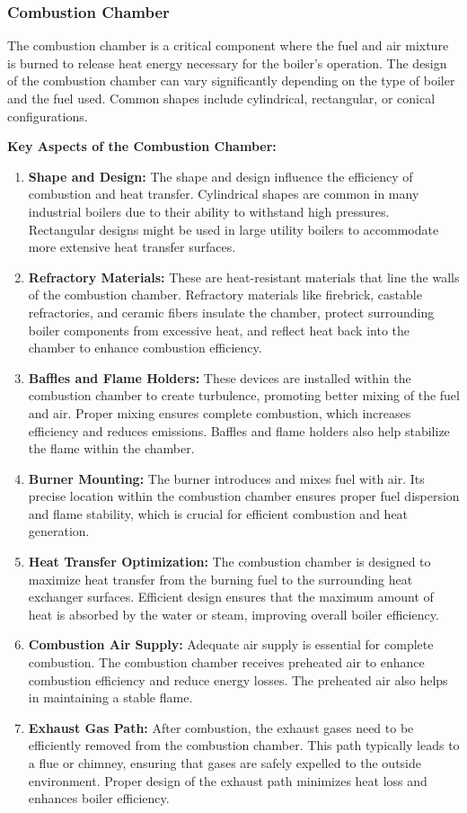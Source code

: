 \subsubsection{Combustion Chamber}
The combustion chamber is a critical component where the fuel and air mixture is burned to release heat energy necessary for the boiler's operation. The design of the combustion chamber can vary significantly depending on the type of boiler and the fuel used. Common shapes include cylindrical, rectangular, or conical configurations.

\textbf{Key Aspects of the Combustion Chamber:}
\begin{enumerate}
    \item \textbf{Shape and Design:} The shape and design influence the efficiency of combustion and heat transfer. Cylindrical shapes are common in many industrial boilers due to their ability to withstand high pressures. Rectangular designs might be used in large utility boilers to accommodate more extensive heat transfer surfaces.
    \item \textbf{Refractory Materials:} These are heat-resistant materials that line the walls of the combustion chamber. Refractory materials like firebrick, castable refractories, and ceramic fibers insulate the chamber, protect surrounding boiler components from excessive heat, and reflect heat back into the chamber to enhance combustion efficiency.
    \item \textbf{Baffles and Flame Holders:} These devices are installed within the combustion chamber to create turbulence, promoting better mixing of the fuel and air. Proper mixing ensures complete combustion, which increases efficiency and reduces emissions. Baffles and flame holders also help stabilize the flame within the chamber.
    \item \textbf{Burner Mounting:} The burner introduces and mixes fuel with air. Its precise location within the combustion chamber ensures proper fuel dispersion and flame stability, which is crucial for efficient combustion and heat generation.
    \item \textbf{Heat Transfer Optimization:} The combustion chamber is designed to maximize heat transfer from the burning fuel to the surrounding heat exchanger surfaces. Efficient design ensures that the maximum amount of heat is absorbed by the water or steam, improving overall boiler efficiency.
    \item \textbf{Combustion Air Supply:} Adequate air supply is essential for complete combustion. The combustion chamber receives preheated air to enhance combustion efficiency and reduce energy losses. The preheated air also helps in maintaining a stable flame.
    \item \textbf{Exhaust Gas Path:} After combustion, the exhaust gases need to be efficiently removed from the combustion chamber. This path typically leads to a flue or chimney, ensuring that gases are safely expelled to the outside environment. Proper design of the exhaust path minimizes heat loss and enhances boiler efficiency.
\end{enumerate}

